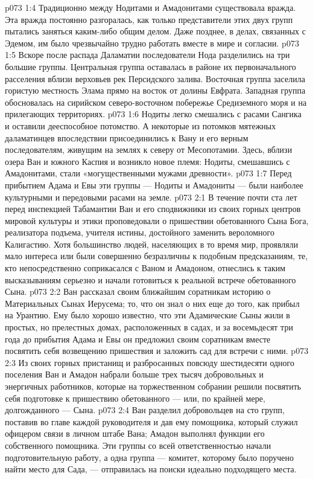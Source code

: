 \vs p073 1:4 Традиционно между Нодитами и Амадонитами существовала вражда. Эта вражда постоянно разгоралась, как только представители этих двух групп пытались заняться каким\hyp{}либо общим делом. Даже позднее, в делах, связанных с Эдемом, им было чрезвычайно трудно работать вместе в мире и согласии.
\vs p073 1:5 Вскоре после распада Даламатии последователи Нода разделились на три большие группы. Центральная группа оставалась в районе их первоначального расселения вблизи верховьев рек Персидского залива. Восточная группа заселила гористую местность Элама прямо на восток от долины Евфрата. Западная группа обосновалась на сирийском северо\hyp{}восточном побережье Средиземного моря и на прилегающих территориях.
\vs p073 1:6 Нодиты легко смешались с расами Сангика и оставили дееспособное потомство. А некоторые из потомков мятежных даламатинцев впоследствии присоединились к Вану и его верным последователям, живущим на землях к северу от Месопотамии. Здесь, вблизи озера Ван и южного Каспия и возникло новое племя: Нодиты, смешавшись с Амадонитами, стали «могущественными мужами древности».
\vs p073 1:7 Перед прибытием Адама и Евы эти группы --- Нодиты и Амадониты --- были наиболее культурными и передовыми расами на земле.
\vs p073 2:1 В течение почти ста лет перед инспекцией Табамантии Ван и его сподвижники из своих горных центров мировой культуры и этики проповедовали о пришествии обетованного Сына Бога, реализатора подъема, учителя истины, достойного заменить вероломного Калигастию. Хотя большинство людей, населяющих в то время мир, проявляли мало интереса или были совершенно безразличны к подобным предсказаниям, те, кто непосредственно соприкасался с Ваном и Амадоном, отнеслись к таким высказываниям серьезно и начали готовиться к реальной встрече обетованного Сына.
\vs p073 2:2 Ван рассказал своим ближайшим соратникам историю о Материальных Сынах Иерусема; то, что он знал о них еще до того, как прибыл на Урантию. Ему было хорошо известно, что эти Адамические Сыны жили в простых, но прелестных домах, расположенных в садах, и за восемьдесят три года до прибытия Адама и Евы он предложил своим соратникам вместе посвятить себя возвещению пришествия и заложить сад для встречи с ними.
\vs p073 2:3 Из своих горных пристанищ и разбросанных повсюду шестидесяти одного поселения Ван и Амадон набрали больше трех тысяч добровольных и энергичных работников, которые на торжественном собрании решили посвятить себя подготовке к пришествию обетованного --- или, по крайней мере, долгожданного --- Сына.
\vs p073 2:4 Ван разделил добровольцев на сто групп, поставив во главе каждой руководителя и дав ему помощника, который служил офицером связи в личном штабе Вана; Амадон выполнял функции его собственного помощника. Эти группы со всей ответственностью начали подготовительную работу, а одна группа --- комитет, которому было поручено найти место для Сада, --- отправилась на поиски идеально подходящего места.
